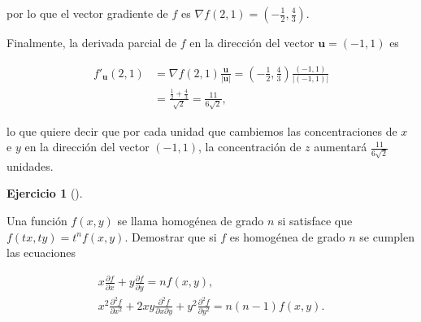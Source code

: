 \documentclass[
  a4paper,
]{scrreport}
\theoremstyle{definition}
\newtheorem{exercise}{Ejercicio}[chapter]
\theoremstyle{remark}
\begin{document}
\begin{tcolorbox}
por lo que el vector gradiente de \(f\) es
\(\nabla f(2,1) = \left(-\frac{1}{2}, \frac{4}{3}\right)\).

Finalmente, la derivada parcial de \(f\) en la dirección del vector
\(\mathbf{u}=(-1,1)\) es

\begin{align*}
f'_{\mathbf{u}}(2,1) 
&= \nabla f(2,1)\frac{\mathbf{u}}{|\mathbf{u}|} 
= \left(-\frac{1}{2}, \frac{4}{3}\right)\frac{(-1,1)}{|(-1,1)|} \\
&= \frac{\frac{1}{2}+\frac{4}{3}}{\sqrt{2}}
= \frac{11}{6\sqrt{2}},
\end{align*}

lo que quiere decir que por cada unidad que cambiemos las
concentraciones de \(x\) e \(y\) en la dirección del vector \((-1,1)\),
la concentración de \(z\) aumentará \(\frac{11}{6\sqrt{2}}\) unidades.

\end{tcolorbox}

\begin{exercise}[]\protect\hypertarget{exr-funcion-homogenea}{}\label{exr-funcion-homogenea}

Una función \(f(x,y)\) se llama homogénea de grado \(n\) si satisface
que \(f(tx, ty) = t^nf(x,y)\). Demostrar que si \(f\) es homogénea de
grado \(n\) se cumplen las ecuaciones

\[
\begin{gathered}
x\frac{\partial f}{\partial x} + y \frac{\partial f}{\partial y} = nf(x,y),\\
x^2\frac{\partial^2 f}{\partial x^2} + 2xy \frac{\partial^2 f}{\partial x \partial y} + y^2 \frac{\partial^2 f}{\partial y^2} = n(n-1)f(x,y).
\end{gathered}
\]

\end{exercise}
\end{document}
